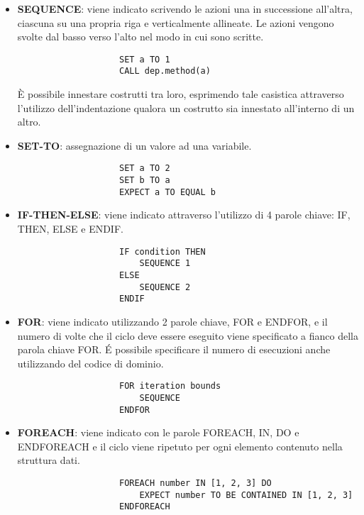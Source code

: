             \begin{itemize}
                \item \textbf{SEQUENCE}: viene indicato scrivendo le azioni una in successione all'altra, ciascuna su una propria riga e verticalmente allineate. Le azioni vengono svolte dal basso verso l'alto nel modo in cui sono scritte.
                \begin{verbatim}
                    SET a TO 1
                    CALL dep.method(a)
                \end{verbatim}
                È possibile innestare costrutti tra loro, esprimendo tale casistica attraverso l'utilizzo dell'indentazione qualora un costrutto sia innestato all'interno di un altro.

                \item \textbf{SET-TO}: assegnazione di un valore ad una variabile.
                \begin{verbatim}
                    SET a TO 2
                    SET b TO a
                    EXPECT a TO EQUAL b
                \end{verbatim}

                \item \textbf{IF-THEN-ELSE}: viene indicato attraverso l'utilizzo di 4 parole chiave: IF, THEN, ELSE e ENDIF.
                \begin{verbatim}
                    IF condition THEN
                        SEQUENCE 1
                    ELSE
                        SEQUENCE 2
                    ENDIF
                \end{verbatim}

                \item \textbf{FOR}: viene indicato utilizzando 2 parole chiave, FOR e ENDFOR, e il numero di volte che il ciclo deve essere eseguito viene specificato a fianco della parola chiave FOR. É possibile specificare il numero di esecuzioni anche utilizzando del codice di dominio.
                \begin{verbatim}
                    FOR iteration bounds
                        SEQUENCE
                    ENDFOR
                \end{verbatim}

                \item \textbf{FOREACH}: viene indicato con le parole FOREACH, IN, DO e ENDFOREACH e il ciclo viene ripetuto per ogni elemento contenuto nella struttura dati.
                \begin{verbatim}
                    FOREACH number IN [1, 2, 3] DO
                        EXPECT number TO BE CONTAINED IN [1, 2, 3]
                    ENDFOREACH
                \end{verbatim}


\end{itemize}
